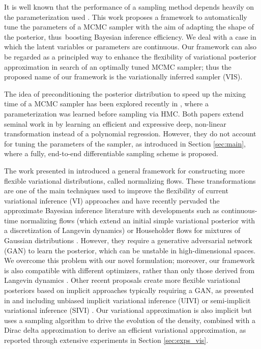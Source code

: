 It is well known that the performance of a sampling method depends
heavily on the parameterization used \parencite{papaspiliopoulos2007general}. This work proposes
a framework to automatically tune the parameters of a 
MCMC sampler {with the aim of adapting the shape of the posterior, thus~boosting  Bayesian inference efficiency. 
 We deal with a case in which the latent variables or parameters are continuous. Our framework can also be regarded as a principled way to enhance the flexibility of  variational posterior approximation in search of an optimally tuned MCMC sampler;} thus the proposed name of our framework is {the variationally inferred sampler} (VIS).


{

The idea of preconditioning the posterior distribution to speed up the mixing time of a MCMC sampler has been explored recently in \parencite{hoffmanneutra,PhysRevLett.121.260601}, where a parameterization was learned before sampling via HMC. Both papers extend seminal work in \parencite{parno2014transport} by learning an efficient and expressive deep, non-linear transformation instead of a polynomial regression. However, they do not account for tuning the parameters of the sampler, as introduced in Section \ref{sec:main}, where a fully, end-to-end differentiable sampling scheme is proposed.

The work presented in \parencite{rezende2015variational} introduced a general
framework for constructing more flexible variational distributions, called normalizing flows. These transformations are one of the main techniques used to improve the flexibility of current variational inference (VI) approaches and have recently pervaded the approximate Bayesian inference
literature with developments such as continuous-time normalizing flows \parencite{chen2018continuoustime} (which extend an initial simple variational posterior with a discretization of Langevin dynamics) or Householder flows for mixtures of Gaussian distributions \parencite{LIU201943}. However, they require a generative adversarial network (GAN) \parencite{goodfellow2014generative} to learn the posterior,
which can be unstable in high-dimensional spaces. We overcome this problem with our novel formulation; moreover, our framework is also compatible with different optimizers, rather than only those derived from Langevin dynamics \parencite{mandt2017stochastic}. Other recent proposals create more flexible variational posteriors based on implicit approaches typically requiring a GAN, as presented in \parencite{huszar2017variational} and including unbiased implicit variational inference (UIVI)
\parencite{pmlr-v89-titsias19a} or semi-implicit variational inference (SIVI) \parencite{yin2018semi}. Our variational approximation is also implicit but uses a sampling algorithm to drive the evolution of the density, combined with a Dirac delta approximation to derive an efficient variational approximation, as reported through extensive experiments in Section \ref{sec:exps_vis}.

}
